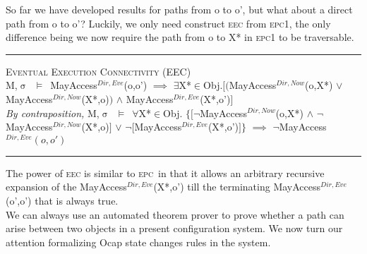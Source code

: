 \documentclass[a4paper,11pt, twoside,twocolumn]{article}
\newenvironment{logic}[1][]
{\begin{flushleft} \small }
{\end{flushleft}}
\newcommand{\loin}{$\in$}
\newcommand{\loforall}{$\forall$}
\newcommand{\loexists}{$\exists$}
\newcommand{\loand}{$\land$}
\newcommand{\loor} {$\lor$}
\newcommand{\loimplies}{$\implies$}
\newcommand{\losigma}{$\upsigma$}
\newcommand{\loturns} {$\vDash$}
\newcommand{\loneg}{$\boldsymbol \neg$}
\newcommand{\ablock} {\null\qquad}
\begin{document}
So far we have developed results for paths from o to o', but what about a direct path from o to o'? Luckily, we only need construct \textsc{eec} from \textsc{epc1}, the only difference being we now require the path from o to X* in \textsc{epc1} to be traversable.

\begin{logic}
\hrule\null
\textsc{\normalsize *Eventual Execution Connectivity (EEC)}\\
M,\losigma\ \loturns\ MayAccess$^{Dir,Eve}$(o,o')\linebreak
\ablock \loimplies\linebreak
\ablock \loexists X*\loin Obj.$[($MayAccess$^{Dir,Now}$(o,X*) \loor \linebreak
\ablock \ablock \ablock \ablock MayAccess$^{Dir,Now}$(X*,o)$)$\linebreak
\ablock \ablock \ablock \ablock \loand \linebreak
\ablock \ablock \ablock \ablock MayAccess$^{Dir,Eve}$(X*,o')$]$
\linebreak \\
\textit{By contraposition,}\linebreak
M,\losigma\ \loturns\ 
\loforall X*\loin Obj. $\{[$\loneg MayAccess$^{Dir,Now}$(o,X*) \loand \linebreak
\ablock \ablock \ablock \ablock \quad \loneg MayAccess$^{Dir,Now}$(X*,o)$]$\linebreak
\ablock \ablock \ablock \ablock \loor \linebreak
\ablock \ablock \ablock \ablock \loneg $[$MayAccess$^{Dir,Eve}$(X*,o')$]\}$\linebreak
\ablock \loimplies\linebreak
	\ablock\loneg MayAccess$^{Dir,Eve}(o,o')$\linebreak
\hrule
\end{logic}
The power of \textsc{eec} is similar to \textsc{epc}\ in that it allows an arbitrary recursive expansion of the MayAccess$^{Dir,Eve}$(X*,o') till the terminating MayAccess$^{Dir,Eve}$(o',o') that is always true.\\

We can always use an automated theorem prover to prove whether a path can arise between two objects in a present configuration system.
We now turn our attention formalizing Ocap state changes rules in the system.\\
\end{document}
